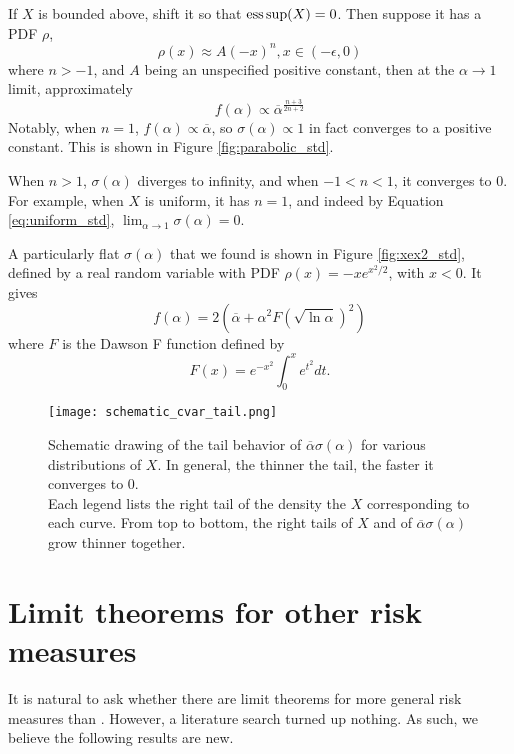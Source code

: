 \begin{ex}
	If $X$ is bounded above, shift it so that $\operatorname*{ess\,sup}(X) = 0$. Then suppose it has a PDF $\rho$,
	$$\rho(x) \approx A(-x)^n, x \in (-\epsilon, 0)$$
	where $n > -1$, and $A$ being an unspecified positive constant, then at the $\alpha \to 1$ limit, approximately
	\begin{equation}
	f(\alpha)\propto {\overbar\alpha}^{\frac{n+3}{2n+2}} 
	\end{equation}
	Notably, when $n=1$, $f(\alpha)\propto {\overbar\alpha}$, so $\sigma(\alpha) \propto 1$ in fact converges to a positive constant. This is shown in Figure \ref{fig:parabolic_std}. 
	
	When $ n > 1$, $\sigma(\alpha)$ diverges to infinity, and when $-1 < n < 1$, it converges to $0$. For example, when $X$ is uniform, it has $n=1$, and indeed by Equation \ref{eq:uniform_std}, $\lim_{\alpha \to 1}\sigma(\alpha) = 0$.
\end{ex}

\begin{ex}
	A particularly flat $\sigma(\alpha)$ that we found is shown in Figure \ref{fig:xex2_std}, defined by a real random variable with PDF
	$\rho(x) = -xe^{x^2/2}$, with $x < 0$. It gives
	\begin{equation}
	f(\alpha) = 2({\overbar\alpha} + \alpha^2 F(\sqrt{\ln \alpha})^2)
	\end{equation}
	where $F$ is the Dawson F function defined by
	\begin{equation}
	F(x) = e^{-x^2} \int_0^x e^{t^2} dt.
	\end{equation}
\end{ex}

\begin{figure}
	\centering
	\texttt{[image: schematic\_cvar\_tail.png]}
	\caption{Schematic drawing of the tail behavior of ${\overbar\alpha}\sigma(\alpha)$ for various distributions of $X$. In general, the thinner the tail, the faster it converges to $0$.\\
	Each legend lists the right tail of the density the $X$ corresponding to each curve. From top to bottom, the right tails of $X$ and of ${\overbar\alpha}\sigma(\alpha)$ grow thinner together.}
	\label{fig:schematic_cvar_tail}
\end{figure}


\section{Limit theorems for other risk measures}
It is natural to ask whether there are limit theorems for more general risk measures than \cvar. However, a literature search turned up nothing. As such, we believe the following results are new.


